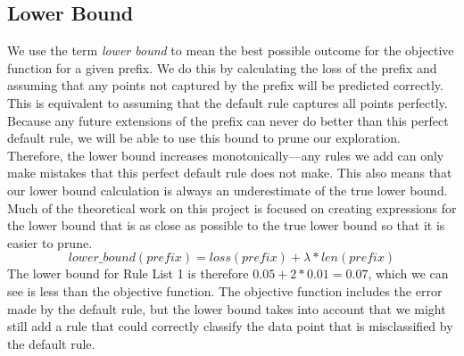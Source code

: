 \subsection{Lower Bound}
We use the term \textit{lower bound} to mean the best possible outcome for the objective function for a given prefix.
We do this by calculating the loss of the prefix and assuming that any points not captured by the prefix will be predicted correctly.
This is equivalent to assuming that the default rule captures all points perfectly.
Because any future extensions of the prefix can never do better than this perfect default rule, we will be able to use this bound to prune our exploration.
Therefore, the lower bound increases monotonically---any rules we add can only make mistakes that this perfect default rule does not make.
This also means that our lower bound calculation is always an underestimate of the true lower bound.
Much of the theoretical work on this project is focused on creating expressions for the lower bound that is as close as possible to the true lower bound so that it is easier to prune. 
$$lower\_bound(prefix) = loss(prefix) + \lambda * len(prefix)$$
The lower bound for Rule List 1 is therefore $0.05 + 2 * 0.01 = 0.07$, which we can see is less than the objective function.
The objective function includes the error made by the default rule, but the lower bound takes into account that we might still add a rule that could correctly classify the data point that is misclassified by the default rule.

